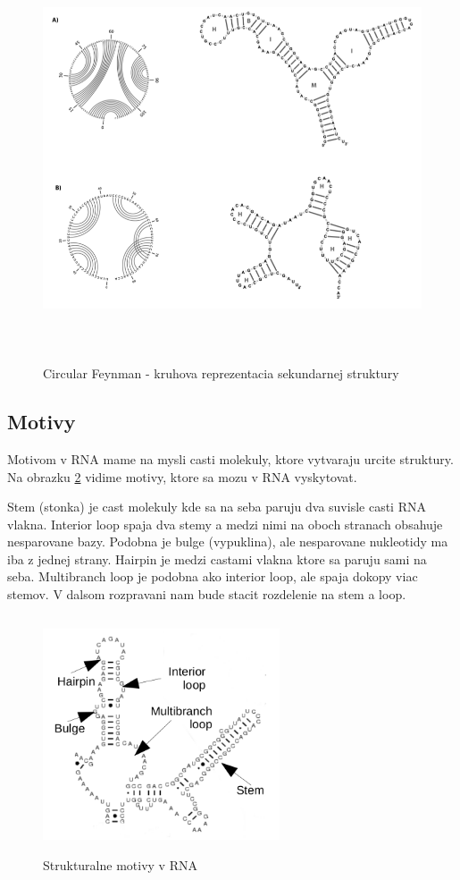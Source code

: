 \begin{figure}[H]
\centering
\includegraphics[width=140mm, height=120mm]{../img/RNA_circular_reprezentation.png}
\caption{Circular Feynman - kruhova reprezentacia sekundarnej struktury}
\label{obr:RNA_circular_representation}
\end{figure}


\subsection{Motivy}

Motivom v RNA mame na mysli casti molekuly, ktore vytvaraju urcite struktury.
Na obrazku \ref{obr:RNA_motifs} vidime motivy, ktore sa mozu v RNA vyskytovat.

Stem (stonka) je cast molekuly kde sa na seba paruju dva suvisle casti RNA vlakna.
Interior loop spaja dva stemy a medzi nimi na oboch stranach obsahuje nesparovane
bazy. Podobna je bulge (vypuklina), ale nesparovane nukleotidy ma iba z jednej strany.
Hairpin je medzi castami vlakna ktore sa paruju sami na seba.
Multibranch loop je podobna ako interior loop, ale spaja dokopy viac stemov.
V dalsom rozpravani nam bude stacit rozdelenie na stem a loop.


\begin{figure}[H]
\centering
\includegraphics[width=70mm, height=70mm]{../img/struktury_v_rna.png}
\caption{Strukturalne motivy v RNA}
\label{obr:RNA_motifs}
\end{figure}

